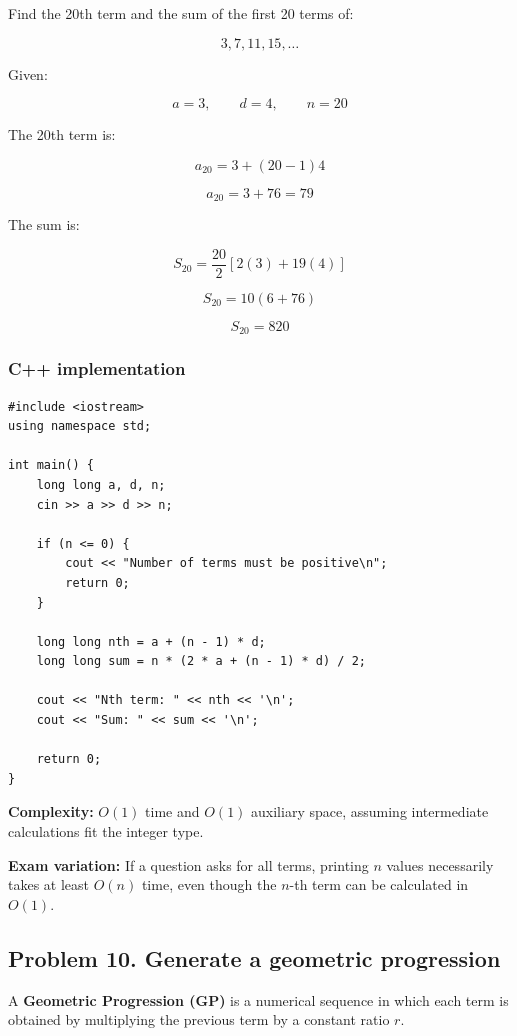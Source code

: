 Find the 20th term and the sum of the first 20 terms of:


\[
3,7,11,15,\ldots
\]


Given:


\[
a=3,\qquad d=4,\qquad n=20
\]


The 20th term is:


\[
a_{20}=3+(20-1)4
\]



\[
a_{20}=3+76=\boxed{79}
\]


The sum is:


\[
S_{20}=\frac{20}{2}[2(3)+19(4)]
\]



\[
S_{20}=10(6+76)
\]



\[
\boxed{S_{20}=820}
\]


\subsubsection{C++ implementation}

\begin{lstlisting}[style=cppstyle]
#include <iostream>
using namespace std;

int main() {
    long long a, d, n;
    cin >> a >> d >> n;

    if (n <= 0) {
        cout << "Number of terms must be positive\n";
        return 0;
    }

    long long nth = a + (n - 1) * d;
    long long sum = n * (2 * a + (n - 1) * d) / 2;

    cout << "Nth term: " << nth << '\n';
    cout << "Sum: " << sum << '\n';

    return 0;
}
\end{lstlisting}

\textbf{Complexity:} $O(1)$ time and $O(1)$ auxiliary space, assuming intermediate calculations fit the integer type.

\textbf{Exam variation:} If a question asks for all terms, printing $n$ values necessarily takes at least $O(n)$ time, even though the $n$-th term can be calculated in $O(1)$.

\subsection{Problem 10. Generate a geometric progression}

A \textbf{Geometric Progression (GP)} is a numerical sequence in which each term is obtained by multiplying the previous term by a constant ratio $r$.

